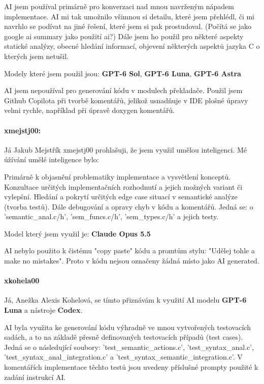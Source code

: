 \documentclass[a4paper,11pt]{article}
\begin{document}
AI jsem používal primárně pro konverzaci nad mnou navrženým nápadem implementace. AI mi tak umožnilo všimnou si detailu, které jsem přehlédl, či mi navrhlo se podívat na jiné řešení, které jsem si pak prostudoval. (Počítá se jako google ai summary jako použití ai?)
Dále jsem ho použil pro některé aspekty statické analýzy, obecné hledání informací, objevení některých aspektů jazyka C o kterých jsem netušil.

Modely které jsem použil jsou:
\textbf{GPT-6 Sol}, \textbf{GPT-6 Luna}, \textbf{GPT-6 Astra}

AI jsem nepoužíval pro generování kódu v modulech překladače.
Použil jsem Github Copilota při tvorbě komentářů, jelikož usnadňuje v IDE plošné úpravy velmi rychle, například při úpravě doxygen komentářů.

\paragraph{xmejstj00:}
Já Jakub Mejstřík xmejstj00 prohlašuji, že jsem využil umělou inteligenci. Mé úžívání umělé inteligence bylo:

Primárně k objasnění problematiky implementace a vysvětlení konceptů. Konzultace určitých implementačních rozhodnutí a jejich možných variant či vylepšní. Hledání a pokrytí určitých edge case situací v semantické analýze (tvorba testů). Dále debugování a opravy chyb v kódu a komentářů. Jedná se: o 'semantic\_anal.c/h', 'sem\_funcs.c/h', 'sem\_types.c/h' a jejich testy.

Model který jsem využil je: \textbf{Claude Opus 5.5}

AI nebylo použito k čistému "copy paste" kódu a promtům stylu: "Udělej tohle a make no mistakes". Proto v kódu nejsou označeny žádná místo jako AI generated.

\paragraph{xkohela00} 
Já, Anežka Alexis Kohelová, se tímto přiznávám k využití AI modelu \textbf{GPT-6 Luna} a nástroje \textbf{Codex}.

AI byla využita ke generování kódu výhradně ve mnou vytvořených testovacích sadách, a to na základě přesně definovaných testovacích případů (test cases). Jedná se o následující soubory: 'test\_semantic\_actions.c', 'test\_syntax\_anal.c', 'test\_syntax\_anal\_integration.c' a 'test\_syntax\_semantic\_integration.c'. V komentářích implementace těchto testů jsou uvedeny příslušné prompty použité k zadání instrukcí AI.
\end{document}
